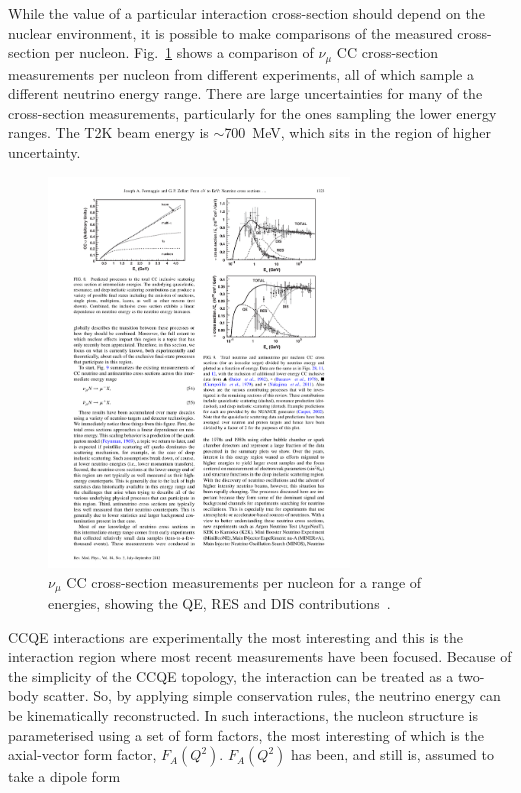 \newline
\newline
While the value of a particular interaction cross-section should depend on the nuclear environment, it is possible to make comparisons of the measured cross-section per nucleon.  Fig.~\ref{fig:CrossSectionMeasurements} shows a comparison of $\nu_\mu$ CC cross-section measurements per nucleon from different experiments, all of which sample a different neutrino energy range.  There are large uncertainties for many of the cross-section measurements, particularly for the ones sampling the lower energy ranges.  The T2K beam energy is $\sim$700~MeV, which sits in the region of higher uncertainty.
\begin{figure}[b]%
  \centering
  \includegraphics[width=8cm]{images/neutrino_interactions/CrossSectionMeasurements.pdf}
  \caption{$\nu_\mu$ CC cross-section measurements per nucleon for a range of energies, showing the QE, RES and DIS contributions~\cite{RevModPhys.84.1307}.}
  \label{fig:CrossSectionMeasurements}
\end{figure}
\newline
\newline
CCQE interactions are experimentally the most interesting and this is the interaction region where most recent measurements have been focused.  Because of the simplicity of the CCQE topology, the interaction can be treated as a two-body scatter.  So, by applying simple conservation rules, the neutrino energy can be kinematically reconstructed.  In such interactions, the nucleon structure is parameterised using a set of form factors, the most interesting of which is the axial-vector form factor, $F_A(Q^2)$. $F_A(Q^2)$ has been, and still is, assumed to take a dipole form
